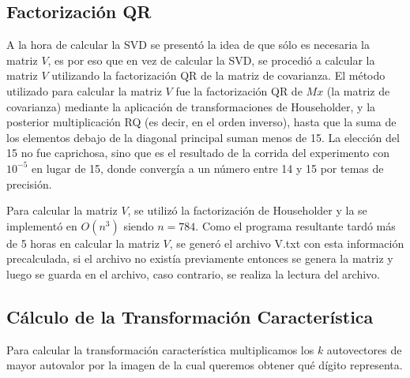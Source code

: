\subsection{Factorizaci\'on QR}
A la hora de calcular la SVD se present\'o la idea de que s\'olo es necesaria la matriz $V$, es por 
eso que en vez de calcular la SVD, se procedi\'o a calcular la matriz $V$ utilizando la factorizaci\'on 
QR de la matriz de covarianza. El m\'etodo utilizado para calcular la matriz $V$ fue la factorizaci\'on
QR de $Mx$ (la matriz de covarianza) mediante la aplicaci\'on de transformaciones de Householder, y la
posterior multiplicaci\'on RQ (es decir, en el orden inverso), hasta que la suma de los elementos debajo 
de la diagonal principal suman menos de 15. La elecci\'on del 15 no fue caprichosa, sino que es el 
resultado de la corrida del experimento con $10^{-5}$ en lugar de 15, donde converg\'ia a un n\'umero 
entre 14 y 15 por temas de precisi\'on.

Para calcular la matriz $V$, se utiliz\'o la factorizaci\'on de Householder y la se implement\'o en $O(n^3)$ 
siendo $n = 784$. Como el programa resultante tard\'o m\'as de 5 horas en calcular la matriz $V$, se gener\'o 
el archivo V.txt con esta informaci\'on precalculada, si el archivo no exist\'ia previamente entonces se 
genera la matriz y luego se guarda en el archivo, caso contrario, se realiza la lectura del archivo.

\subsection{C\'alculo de la Transformaci\'on Caracter\'istica}
Para calcular la transformaci\'on caracter\'istica multiplicamos los $k$ autovectores de mayor autovalor por
la imagen de la cual queremos obtener qu\'e d\'igito representa.